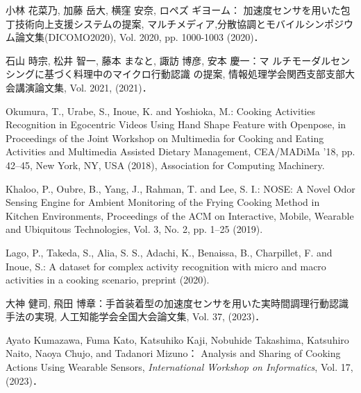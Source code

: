 \begin{thebibliography}{参考文献}
	小林 花菜乃, 加藤 岳大, 横窪 安奈, ロペズ ギヨーム：
	加速度センサを用いた包丁技術向上支援システムの提案, マルチメディア,分散協調とモバイルシンポジウム論文集(DICOMO2020), Vol. 2020, pp. 1000-1003 (2020)．
	
	石山 時宗, 松井 智一, 藤本 まなと, 諏訪 博彦, 安本 慶一：マ
	ルチモーダルセンシングに基づく料理中のマイクロ行動認識
	の提案, 情報処理学会関西支部支部大会講演論文集, Vol. 2021, (2021)．

	Okumura, T., Urabe, S., Inoue, K. and Yoshioka, M.: Cooking Activities Recognition in Egocentric Videos Using Hand Shape Feature with Openpose, in Proceedings of the Joint Workshop on Multimedia for Cooking and Eating Activities and Multimedia Assisted Dietary Management, CEA/MADiMa ’18, pp. 42–45, New York, NY, USA (2018), Association for Computing Machinery.

	Khaloo, P., Oubre, B., Yang, J., Rahman, T. and Lee, S. I.: NOSE: A Novel Odor Sensing Engine for Ambient Monitoring of the Frying Cooking Method in Kitchen Environments, Proceedings of the ACM on Interactive, Mobile, Wearable and Ubiquitous Technologies, Vol. 3, No. 2, pp. 1–25 (2019).

	Lago, P., Takeda, S., Alia, S. S., Adachi, K., Benaissa, B., Charpillet, F. and Inoue, S.: A dataset for complex activity recognition with micro and macro activities in a cooking scenario, preprint (2020).

	大神 健司, 飛田 博章：手首装着型の加速度センサを用いた実時間調理行動認識手法の実現, 人工知能学会全国大会論文集, Vol. 37, (2023)．

	Ayato Kumazawa, Fuma Kato, Katsuhiko Kaji, Nobuhide Takashima, Katsuhiro Naito, Naoya Chujo, and Tadanori Mizuno：
	Analysis and Sharing of Cooking Actions Using Wearable Sensors, 
	\textit{International Workshop on Informatics}, Vol. 17, (2023)．

\end{thebibliography}
